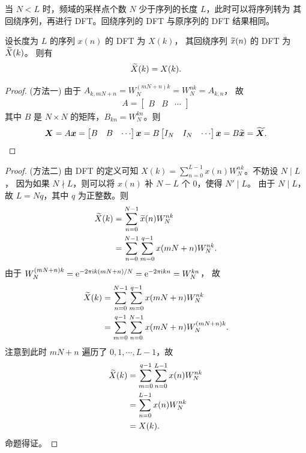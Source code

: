 \begin{example}[$N < L$ 的情况]
    当 $N < L$ 时，频域的采样点个数 $N$ 少于序列的长度 $L$，此时可以将序列转为
    其回绕序列，再进行 DFT。回绕序列的 DFT 与原序列的 DFT 结果相同。
\end{example}

\begin{theorem}
    设长度为 $L$ 的序列 $x(n)$ 的 DFT 为 $X(k)$，
    其回绕序列 $\widetilde{x}(n)$ 的 DFT 为 $\widetilde{X}(k)$。
    则有
    \begin{align*}
        \widetilde{X}(k) = X(k).
    \end{align*}
\end{theorem}

\begin{proof}
    (方法一)
    由于 $A_{k, mN + n} = W_N^{(mN + n)k} = W_N^{nk} = A_{k, n}$，
    故
    \begin{align*}
        A = \begin{bmatrix}
            B & B & \cdots
        \end{bmatrix}
    \end{align*}
    其中 $B$ 是 $N \times N$ 的矩阵，$B_{kn} = W_N^{kn}$。则
    \begin{align*}
        \bm{X} = A\bm{x} = \begin{bmatrix}
            B & B & \cdots
        \end{bmatrix} \bm{x}
        = B\begin{bmatrix}
            I_N & I_N & \cdots
        \end{bmatrix}\bm{x}
        = B\bm{\widetilde{x}} = \bm{\widetilde{X}}.
    \end{align*}
\end{proof}

\begin{proof}
    (方法二)
    由 DFT 的定义可知 $X(k) = \sum_{n = 0}^{L - 1}x(n)W_N^{nk}$。不妨设 $N \mid L$，
    因为如果 $N \nmid L$，则可以将 $x(n)$ 补 $N - L$ 个 $0$，使得 $N' \mid L$。
    由于 $N \mid L$，故 $L = Nq$，其中 $q$ 为正整数。则
    \begin{align*}
        \widetilde{X}(k) & = \sum_{n = 0}^{N - 1}\widetilde{x}(n)W_N^{nk} \\
        & = \sum_{n = 0}^{N - 1}\sum_{m = 0}^{q - 1}x(mN + n)W_N^{nk}.
    \end{align*}
    由于 $W_N^{(mN + n)k} = \mathrm{e}^{-2\pi\mathrm{i} k(mN + n)/N}
        = \mathrm{e}^{-2\pi\mathrm{i} kn} = W_N^{kn}$，
    故
    \begin{align*}
        \widetilde{X}(k) & = \sum_{n = 0}^{N - 1}\sum_{m = 0}^{q - 1}x(mN + n)W_N^{nk} \\
        & = \sum_{m = 0}^{q - 1}\sum_{n = 0}^{N - 1}x(mN + n)W_N^{(mN + n)k}.
    \end{align*}
    注意到此时 $mN + n$ 遍历了 $0, 1, \cdots, L - 1$，故
    \begin{align*}
        \widetilde{X}(k) & = \sum_{m = 0}^{q - 1}\sum_{n = 0}^{L - 1}x(n)W_N^{nk} \\
        & = \sum_{n = 0}^{L - 1}x(n)W_N^{nk} \\
        & = X(k).
    \end{align*}
    命题得证。
\end{proof}


